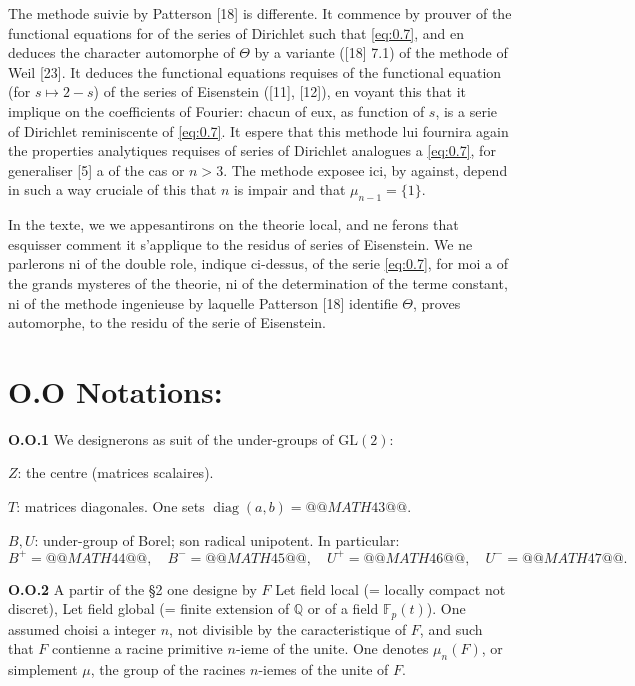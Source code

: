 \documentclass[12pt,a4paper]{article}
\theoremstyle{plain}
\theoremstyle{definition}
\theoremstyle{remark}
\DeclareMathOperator{\diag}{diag}
\newcommand{\QQ}{\mathbb{Q}}
\newcommand{\FF}{\mathbb{F}}
\providecommand{\FF}{\mathbb{F}}
\providecommand{\QQ}{\mathbb{Q}}
\begin{document}
The methode suivie by Patterson [18] is differente. It commence by prouver of the functional equations for of the series of Dirichlet such that \eqref{eq:0.7}, and en deduces the character automorphe of $\Theta$ by a variante ([18] 7.1) of the methode of Weil [23]. It deduces the functional equations requises of the functional equation (for $s \mapsto 2 - s$) of the series of Eisenstein ([11], [12]), en voyant this that it implique on the coefficients of Fourier: chacun of eux, as function of $s$, is a serie of Dirichlet reminiscente of \eqref{eq:0.7}. It espere that this methode lui fournira again the properties analytiques requises of series of Dirichlet analogues a \eqref{eq:0.7}, for generaliser [5] a of the cas or $n > 3$. The methode exposee ici, by against, depend in such a way cruciale of this that $n$ is impair and that $\mu_{n-1} = \{1\}$.

In the texte, we we appesantirons on the theorie local, and ne ferons that esquisser comment it s'applique to the residus of series of Eisenstein. We ne parlerons ni of the double role, indique ci-dessus, of the serie \eqref{eq:0.7}, for moi a of the grands mysteres of the theorie, ni of the determination of the terme constant, ni of the methode ingenieuse by laquelle Patterson [18] identifie $\Theta$, proves automorphe, to the residu of the serie of Eisenstein.


\section*{O.O Notations:}

\textbf{O.O.1} We designerons as suit of the under-groups of $\mathrm{GL}(2)$:

$Z$: the centre (matrices scalaires).

$T$: matrices diagonales. One sets $\diag(a, b) = @@MATH43@@$.

$B, U$: under-group of Borel; son radical unipotent. In particular:
\[
B^+ = @@MATH44@@, \quad B^- = @@MATH45@@, \quad U^+ = @@MATH46@@, \quad U^- = @@MATH47@@.
\]

\textbf{O.O.2} A partir of the \S 2 one designe by $F$ Let field local (= locally compact not discret), Let field global (= finite extension of $\QQ$ or of a field $\FF_p(t)$). One assumed choisi a integer $n$, not divisible by the caracteristique of $F$, and such that $F$ contienne a racine primitive $n$-ieme of the unite. One denotes $\mu_n(F)$, or simplement $\mu$, the group of the racines $n$-iemes of the unite of $F$.
\end{document}
